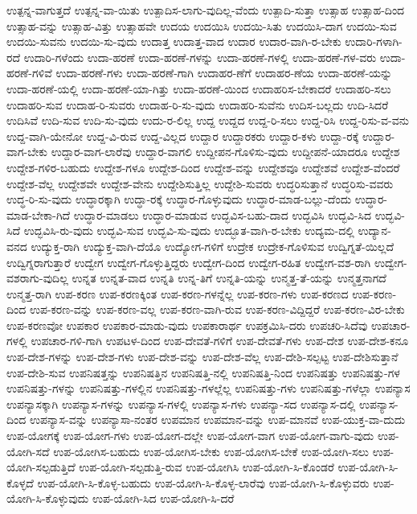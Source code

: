 {ಉತ್ಪನ್ನ-ವಾಗುತ್ತದೆ
ಉತ್ಪನ್ನ-ವಾ-ಯಿತು
ಉತ್ಪಾದಿಸ-ಲಾಗು-ವುದಿಲ್ಲ-ವೆಂದು
ಉತ್ಪಾದಿ-ಸುತ್ತಾ
ಉತ್ಸಾಹ
ಉತ್ಸಾಹ-ದಿಂದ
ಉತ್ಸಾಹ-ವನ್ನು
ಉತ್ಸಾಹ-ವಿತ್ತು
ಉತ್ಸಾಹವೇ
ಉದಯ
ಉದಯಿಸಿ
ಉದಯಿ-ಸಿತು
ಉದಯಿಸಿ-ದಾಗ
ಉದಯಿ-ಸುವ
ಉದಯಿ-ಸುವನು
ಉದಯಿ-ಸು-ವುದು
ಉದಾತ್ತ
ಉದಾತ್ತ-ವಾದ
ಉದಾರ
ಉದಾರ-ವಾಗಿ-ರ-ಬೇಕು
ಉದಾರಿ-ಗಳಾಗಿ-ರದೆ
ಉದಾರಿ-ಗಳೆಂದು
ಉದಾ-ಹರಣೆ
ಉದಾ-ಹರಣೆ-ಗಳನ್ನು
ಉದಾ-ಹರಣೆ-ಗಳಲ್ಲಿ
ಉದಾ-ಹರಣೆ-ಗಳ-ವರು
ಉದಾ-ಹರಣೆ-ಗಳಿವೆ
ಉದಾ-ಹರಣೆ-ಗಳು
ಉದಾ-ಹರಣೆ-ಗಾಗಿ
ಉದಾಹರ-ಣೆಗೆ
ಉದಾಹರ-ಣೆಯ
ಉದಾ-ಹರಣೆ-ಯನ್ನು
ಉದಾ-ಹರಣೆ-ಯಲ್ಲಿ
ಉದಾ-ಹರಣೆ-ಯಾ-ಗಿತ್ತು
ಉದಾ-ಹರಣೆ-ಯಿಂದ
ಉದಾಹರಿಸ-ಬೇಕಾದರೆ
ಉದಾಹರಿ-ಸಲು
ಉದಾಹರಿ-ಸುವ
ಉದಾಹ-ರಿ-ಸುವರು
ಉದಾಹ-ರಿ-ಸು-ವುದು
ಉದಾಹರಿ-ಸುವೆನು
ಉದಿಸ-ಬಲ್ಲದು
ಉದಿ-ಸಿದರೆ
ಉದಿಸಿವೆ
ಉದಿ-ಸುವ
ಉದಿ-ಸು-ವುದು
ಉದು-ರ-ಲಿಲ್ಲ
ಉದ್ದ
ಉದ್ದದ
ಉದ್ದ-ರಿ-ಸಲು
ಉದ್ದ-ರಿಸಿ
ಉದ್ದ-ರಿಸು-ವ-ವನು
ಉದ್ದ-ವಾಗಿ-ಯೇನೋ
ಉದ್ದ-ವಿ-ರುವ
ಉದ್ದ-ವಿಲ್ಲದ
ಉದ್ದಾರ
ಉದ್ದಾರಕರು
ಉದ್ದಾರ-ಕಳು
ಉದ್ದಾ-ರಕ್ಕೆ
ಉದ್ದಾರ-ವಾಗ-ಬೇಕು
ಉದ್ದಾರ-ವಾಗ-ಲಾರೆವು
ಉದ್ದಾರ-ವಾಗಲಿ
ಉದ್ದೀಪನ-ಗೊಳಿಸು-ವುದು
ಉದ್ದೀಪನೆ-ಯಾದರೂ
ಉದ್ದೇಶ
ಉದ್ದೇಶ-ಗಳಿರ-ಬಹುದು
ಉದ್ದೇಶ-ಗಳೂ
ಉದ್ದೇಶ-ದಿಂದ
ಉದ್ದೇಶ-ವನ್ನು
ಉದ್ದೇಶವೂ
ಉದ್ದೇಶವೆ
ಉದ್ದೇಶ-ವೆಂದರೆ
ಉದ್ದೇಶ-ವೆಲ್ಲ
ಉದ್ದೇಶವೇ
ಉದ್ದೇಶ-ವೇನು
ಉದ್ದೇಶಿಸುತ್ತಿಲ್ಲ
ಉದ್ದೇಶಿ-ಸುವರು
ಉದ್ಧರಿಸುತ್ತಾನೆ
ಉದ್ಧರಿಸು-ವವರು
ಉದ್ಧ-ರಿ-ಸು-ವುದು
ಉದ್ಧಾರಕ್ಕಾಗಿ
ಉದ್ಧಾ-ರಕ್ಕೆ
ಉದ್ಧಾರ-ಗೊಳ್ಳುವುದು
ಉದ್ಧಾರ-ಮಾಡ-ಬಲ್ಲು-ದೆಂದು
ಉದ್ಧಾರ-ಮಾಡ-ಬೇಕಾ-ಗಿದೆ
ಉದ್ಧಾರ-ಮಾಡಲು
ಉದ್ಧಾರ-ಮಾಡುವ
ಉದ್ಭವಿಸ-ಬಹು-ದಾದ
ಉದ್ಭವಿಸಿ
ಉದ್ಭವಿ-ಸಿದ
ಉದ್ಭವಿ-ಸಿದೆ
ಉದ್ಭವಿಸಿ-ರು-ವುದು
ಉದ್ಭವಿ-ಸುವ
ಉದ್ಭವಿ-ಸು-ವುದು
ಉದ್ಭೂತ-ವಾಗಿ-ರ-ಬೇಕು
ಉದ್ಯಮ-ದಲ್ಲಿ
ಉದ್ಯಾನ-ವನದ
ಉದ್ಯುಕ್ತ-ರಾಗಿ
ಉದ್ಯುಕ್ತ-ವಾಗಿ-ದೆಯೊ
ಉದ್ಯೋಗ-ಗಳಿಗೆ
ಉದ್ರೇಕ
ಉದ್ರೇಕ-ಗೊಳಿಸುವ
ಉದ್ವಿಗ್ನತೆ-ಯಿಲ್ಲದೆ
ಉದ್ವಿಗ್ನರಾಗುತ್ತಾರೆ
ಉದ್ವೇಗ
ಉದ್ವೇಗ-ಗೊಳ್ಳುತ್ತಿದ್ದರು
ಉದ್ವೇಗ-ದಿಂದ
ಉದ್ವೇಗ-ರಹಿತ
ಉದ್ವೇಗ-ವಶ-ರಾಗಿ
ಉದ್ವೇಗ-ವಶರಾಗು-ವುದಿಲ್ಲ
ಉನ್ನತ
ಉನ್ನತ-ವಾದ
ಉನ್ನತಿ
ಉನ್ನ-ತಿಗೆ
ಉನ್ನತಿ-ಯನ್ನು
ಉನ್ಮತ್ತ-ತೆ-ಯನ್ನು
ಉನ್ಮತ್ತನಾಗದೆ
ಉನ್ಮತ್ತ-ರಾಗಿ
ಉಪ-ಕರಣ
ಉಪ-ಕರಣಕ್ಕಿಂತ
ಉಪ-ಕರಣ-ಗಳನ್ನೆಲ್ಲ
ಉಪ-ಕರಣ-ಗಳು
ಉಪ-ಕರಣದ
ಉಪ-ಕರಣ-ದಿಂದ
ಉಪ-ಕರಣ-ವನ್ನು
ಉಪ-ಕರಣ-ವಲ್ಲ
ಉಪ-ಕರಣ-ವಾಗಿ-ರುವ
ಉಪ-ಕರಣ-ವಿದ್ದಿದ್ದರೆ
ಉಪ-ಕರಣ-ವಿರ-ಬೇಕು
ಉಪ-ಕರಣವೋ
ಉಪಕಾರ
ಉಪಕಾರ-ಮಾಡು-ವುದು
ಉಪಕಾರಾರ್ಥ
ಉಪಕ್ರಮಿಸಿ-ದರು
ಉಪಚರಿ-ಸಿದೆವು
ಉಪಚಾರ-ಗಳಲ್ಲಿ
ಉಪಚಾರ-ಗಳಿ-ಗಾಗಿ
ಉಪಟಳ-ದಿಂದ
ಉಪ-ದೇವತೆ-ಗಳಿಗೆ
ಉಪ-ದೇವತೆ-ಗಳು
ಉಪ-ದೇಶ
ಉಪ-ದೇಶ-ಕನೂ
ಉಪ-ದೇಶ-ಗಳನ್ನು
ಉಪ-ದೇಶ-ಗಳು
ಉಪ-ದೇಶ-ವನ್ನು
ಉಪ-ದೇಶ-ವೆಲ್ಲ
ಉಪ-ದೇಶಿ-ಸಲ್ಪಟ್ಟ
ಉಪ-ದೇಶಿಸುತ್ತಾನೆ
ಉಪ-ದೇಶಿ-ಸುವ
ಉಪನಿಷತ್ತನ್ನು
ಉಪನಿಷತ್ತಿನ
ಉಪನಿಷತ್ತಿ-ನಲ್ಲಿ
ಉಪನಿಷತ್ತಿ-ನಿಂದ
ಉಪನಿಷತ್ತು
ಉಪನಿಷತ್ತು-ಗಳ
ಉಪನಿಷತ್ತು-ಗಳನ್ನು
ಉಪನಿಷತ್ತು-ಗಳಲ್ಲಿನ
ಉಪನಿಷತ್ತು-ಗಳಲ್ಲೆಲ್ಲ
ಉಪನಿಷತ್ತು-ಗಳು
ಉಪನಿಷತ್ತು-ಗಳೆಲ್ಲಾ
ಉಪನ್ಯಾಸ
ಉಪನ್ಯಾಸಕ್ಕಾಗಿ
ಉಪನ್ಯಾಸ-ಗಳನ್ನು
ಉಪನ್ಯಾಸ-ಗಳಲ್ಲಿ
ಉಪನ್ಯಾಸ-ಗಳು
ಉಪನ್ಯಾ-ಸದ
ಉಪನ್ಯಾಸ-ದಲ್ಲಿ
ಉಪನ್ಯಾಸ-ದಿಂದ
ಉಪನ್ಯಾಸ-ವನ್ನು
ಉಪನ್ಯಾಸಾ-ನಂತರ
ಉಪಮಾನ
ಉಪಮಾನ-ವನ್ನು
ಉಪ-ಮಾನವೆ
ಉಪ-ಯುಕ್ತ-ವಾ-ದುದು
ಉಪ-ಯೋಗಕ್ಕೆ
ಉಪ-ಯೋಗ-ಗಳು
ಉಪ-ಯೋಗ-ದಲ್ಲೇ
ಉಪ-ಯೋಗ-ವಾಗ
ಉಪ-ಯೋಗ-ವಾಗು-ವುದು
ಉಪ-ಯೋಗಿ-ಸದೆ
ಉಪ-ಯೋಗಿಸ-ಬಹುದು
ಉಪ-ಯೋಗಿಸ-ಬೇಕು
ಉಪ-ಯೋಗಿಸ-ಬೇಕೆ
ಉಪ-ಯೋಗಿ-ಸಲು
ಉಪ-ಯೋಗಿ-ಸಲ್ಪಡುತ್ತಿದೆ
ಉಪ-ಯೋಗಿ-ಸಲ್ಪಡುತ್ತಿ-ರುವ
ಉಪ-ಯೋಗಿಸಿ
ಉಪ-ಯೋಗಿ-ಸಿ-ಕೊಂಡರೆ
ಉಪ-ಯೋಗಿ-ಸಿ-ಕೊಳ್ಳದೆ
ಉಪ-ಯೋಗಿ-ಸಿ-ಕೊಳ್ಳ-ಬಹುದು
ಉಪ-ಯೋಗಿ-ಸಿ-ಕೊಳ್ಳ-ಲಾರೆವು
ಉಪ-ಯೋಗಿ-ಸಿ-ಕೊಳ್ಳುವರು
ಉಪ-ಯೋಗಿ-ಸಿ-ಕೊಳ್ಳುವುದು
ಉಪ-ಯೋಗಿ-ಸಿದ
ಉಪ-ಯೋಗಿ-ಸಿ-ದರೆ
}
